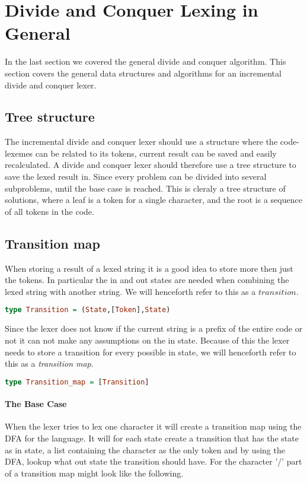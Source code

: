 \section{Divide and Conquer Lexing in General}
In the last section we covered the general divide and conquer algorithm. This
section covers the general data structures and algorithms for an incremental
divide and conquer lexer.

\subsection{Tree structure}
The incremental divide and conquer lexer should use a structure where the
code-lexemes can be related to its tokens, current result can be saved and
easily recalculated. A divide and conquer lexer should therefore use a tree
structure to save the lexed result in. Since every problem can be divided into
several subproblems, until the base case is reached. This is cleraly a tree
structure of solutions, where a leaf is a token for a single character, and the
root is a sequence of all tokens in the code.  

\subsection{Transition map}
When storing a result of a lexed string it is a good idea to store more then
just the tokens. In particular the in and out states are needed when combining
the lexed string with another string. We will henceforth refer to this as a
$transition$.
\begin{lstlisting}[language=Haskell]
type Transition = (State,[Token],State)
\end{lstlisting}
Since the lexer does not know if the current string is a prefix of the entire
code or not it can not make any assumptions on the in state. Because of this the
lexer needs to store a transition for every possible in state, we will henceforth
refer to this as a \emph{transition map}.
\begin{lstlisting}[language=Haskell]
type Transition_map = [Transition]
\end{lstlisting}
\paragraph{The Base Case}
When the lexer tries to lex one character it will create a transition
map using the DFA for the language. It will for each state create a transition
that has the state as in state, a list containing the character as the only
token and by using the DFA, lookup what out state the transition should have.
For the character '/' part of a transition map might look like the following.

